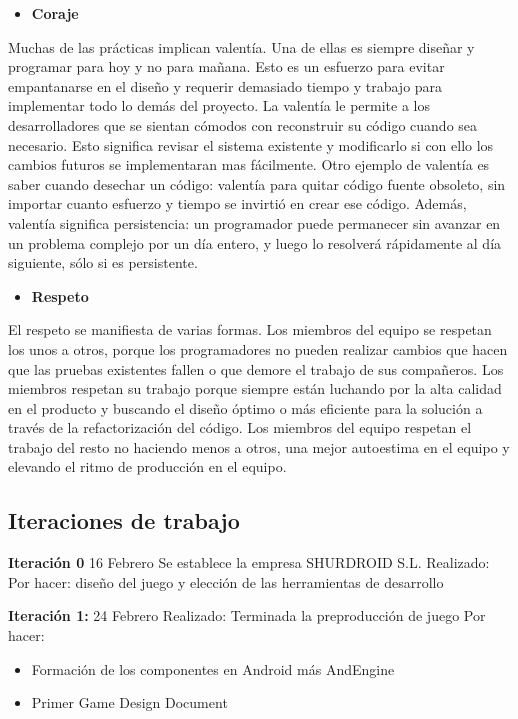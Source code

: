 \documentclass[12 pt, a4paper, twoside]{article}
\begin{document}
\begin{itemize}
\item \textbf{Coraje}
\end{itemize}
Muchas de las prácticas implican valentía. Una de ellas es siempre
diseñar y programar para hoy y no para mañana. Esto es un esfuerzo
para evitar empantanarse en el diseño y requerir demasiado tiempo y
trabajo para implementar todo lo demás del proyecto. La valentía le
permite a los desarrolladores que se sientan cómodos con reconstruir
su código cuando sea necesario. Esto significa revisar el sistema
existente y modificarlo si con ello los cambios futuros se
implementaran mas fácilmente. Otro ejemplo de valentía es saber cuando
desechar un código: valentía para quitar código fuente obsoleto, sin
importar cuanto esfuerzo y tiempo se invirtió en crear ese
código. Además, valentía significa persistencia: un programador puede
permanecer sin avanzar en un problema complejo por un día entero, y
luego lo resolverá rápidamente al día siguiente, sólo si es
persistente.

\begin{itemize}
\item \textbf{Respeto}
\end{itemize}
El respeto se manifiesta de varias formas. Los miembros del equipo se
respetan los unos a otros, porque los programadores no pueden realizar
cambios que hacen que las pruebas existentes fallen o que demore el
trabajo de sus compañeros. Los miembros respetan su trabajo porque
siempre están luchando por la alta calidad en el producto y buscando
el diseño óptimo o más eficiente para la solución a través de la
refactorización del código. Los miembros del equipo respetan el
trabajo del resto no haciendo menos a otros, una mejor autoestima en
el equipo y elevando el ritmo de producción en el equipo.


\subsection{Iteraciones de trabajo}
\textbf{Iteración 0}
16 Febrero Se establece la empresa SHURDROID S.L.
Realizado:
Por hacer: diseño del juego y elección de las herramientas de
desarrollo

\textbf{Iteración 1:}
24 Febrero
Realizado: Terminada la preproducción de juego
Por hacer:
\begin{itemize}
\item Formación de los componentes en Android más AndEngine
\item Primer Game Design Document
\end{itemize}
\end{document}
